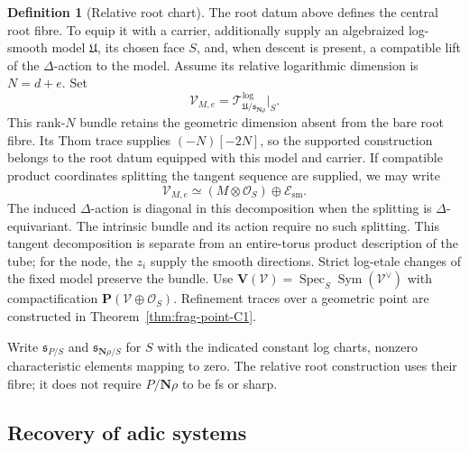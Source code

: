 \documentclass[11pt]{article}
\theoremstyle{definition}
\newtheorem{definition}[theorem]{Definition}
\theoremstyle{remark}
\begin{document}
\begin{definition}[Relative root chart]
The root datum above defines the central root fibre.  To equip it
with a carrier, additionally supply an algebraized log-smooth model
$\mathfrak U$, its chosen face $S$, and, when descent is present, a
compatible lift of the $\Delta$-action to the model.  Assume its
relative logarithmic dimension is $N=d+e$.  Set
\begin{equation}
 \mathcal V_{M,e}=
 \mathcal T^{\log}_{\mathfrak U/\mathfrak s_{\mathbf N\rho}}|_S.
 \label{eq:frag-log-smooth-carrier-bundle}
\end{equation}
This rank-$N$ bundle retains the geometric dimension absent from the
bare root fibre.  Its Thom trace supplies $(-N)[-2N]$, so the supported
construction belongs to the root datum equipped with this model and
carrier.  If compatible product coordinates splitting the tangent
sequence are supplied, we may write
\[
 \mathcal V_{M,e}\simeq(M\otimes\mathcal O_S)
                         \oplus\mathcal E_{\mathrm{sm}}.
\]
The induced $\Delta$-action is diagonal in this decomposition when
the splitting is $\Delta$-equivariant.  The intrinsic bundle and
its action require no such splitting.  This tangent decomposition
is separate from an entire-torus product description of the tube;
for the node, the $z_i$ supply the smooth directions.
Strict log-etale changes of the fixed model preserve the bundle.
Use $\mathbf V(\mathcal V)=\operatorname{Spec}_S
\operatorname{Sym}(\mathcal V^\vee)$ with compactification
$\mathbf P(\mathcal V\oplus\mathcal O_S)$.  Refinement traces over a
geometric point are constructed in Theorem~\ref{thm:frag-point-C1}.

Write $\mathfrak s_{P/S}$ and $\mathfrak s_{\mathbf N\rho/S}$ for
$S$ with the indicated constant log charts, nonzero characteristic
elements mapping to zero.  The relative root construction uses their
fibre; it does not require $P/\mathbf N\rho$ to be fs or sharp.
\end{definition}


\subsection{Recovery of adic systems}
\end{document}
